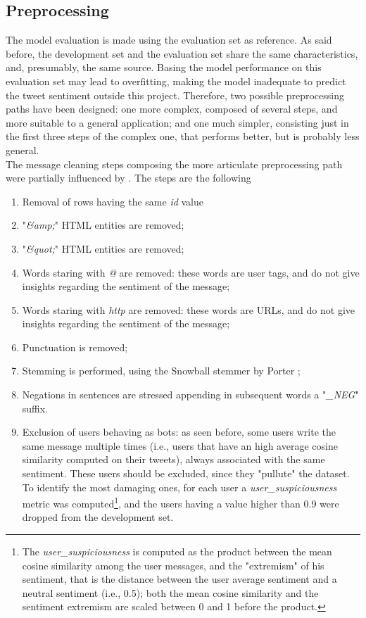 \documentclass[conference]{IEEEtran}
\begin{document}
\subsection{Preprocessing}
The model evaluation is made using the evaluation set as reference. As said before, the development set and the evaluation set share the same characteristics, and, presumably, the same source. Basing the model performance on this evaluation set may lead to overfitting, making the model inadequate to predict the tweet sentiment outside this project. Therefore, two possible preprocessing paths have been designed: one more complex, composed of several steps, and more suitable to a general application; and one much simpler, consisting just in the first three steps of the complex one, that performs better, but is probably less general. \\
The message cleaning steps composing the more articulate preprocessing path were partially influenced by \cite{ZainuddinNurulhuda2016TFSa}. The steps are the following
\begin{enumerate}
    \item Removal of rows having the same \textit{id} value
    \item "\textit{\&amp;}" HTML entities are removed;
    \item "\textit{\&quot;}" HTML entities are removed; 
    \item Words staring with \textit{@} are removed: these words are user tags, and do not give insights regarding the sentiment of the message; 
    \item Words staring with \textit{http} are removed: these words are URLs, and do not give insights regarding the sentiment of the message;
    \item Punctuation is removed;
    \item Stemming is performed, using the Snowball stemmer by Porter \cite{Porter2006};
    \item Negations in sentences are stressed appending in subsequent words a "\textit{\_NEG}" suffix.
    \item Exclusion of users behaving as bots: as seen before, some users write the same message multiple times (i.e., users that have an high average cosine similarity computed on their tweets), always associated with the same sentiment. These users should be excluded, since they "pullute" the dataset. To identify the most damaging ones, for each user a \textit{user\_suspiciousness} metric was computed\footnote{The \textit{user\_suspiciousness} is computed as the product between the mean cosine similarity among the user messages, and the "extremism" of his sentiment, that is the distance between the user average sentiment and a neutral sentiment (i.e., 0.5); both the mean cosine similarity and the sentiment extremism are scaled between 0 and 1 before the product.}, and the users having a value higher than 0.9 were dropped from the development set. 
\end{enumerate}
\end{document}
